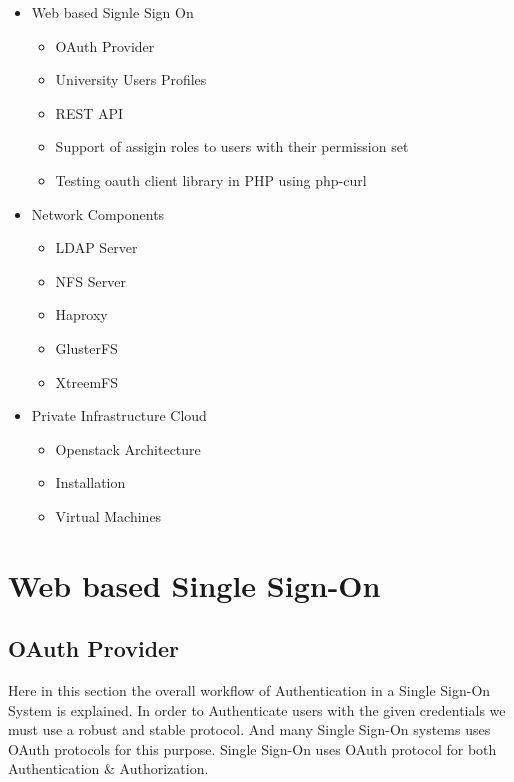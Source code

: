 \documentclass[12pt]{report}
\begin{document}
	\begin{itemize}
		\item Web based Signle Sign On
		\begin{itemize}
			\item OAuth Provider 
			\item University Users Profiles 
			\item REST API 
			\item Support of assigin roles to users with their permission set
			\item Testing oauth client library in PHP using php-curl
		\end{itemize}
		\item Network Components
		\begin{itemize}
			\item LDAP Server
			\item NFS Server
			\item Haproxy
			\item GlusterFS
			\item XtreemFS
		\end{itemize}
		\item Private Infrastructure Cloud
		\begin{itemize}
			\item Openstack Architecture
			\item Installation
			\item Virtual Machines
		\end{itemize}		 			

	\end{itemize}

\chapter{Web based Single Sign-On}

\section{OAuth Provider}
\hspace{6mm} \linebreak Here in this section the overall workflow of Authentication in a Single Sign-On System is explained. In order to Authenticate users with the given credentials we must use a robust and stable protocol. And many Single Sign-On systems uses OAuth protocols for this purpose. Single Sign-On uses OAuth protocol for both Authentication \& Authorization.
\end{document}

